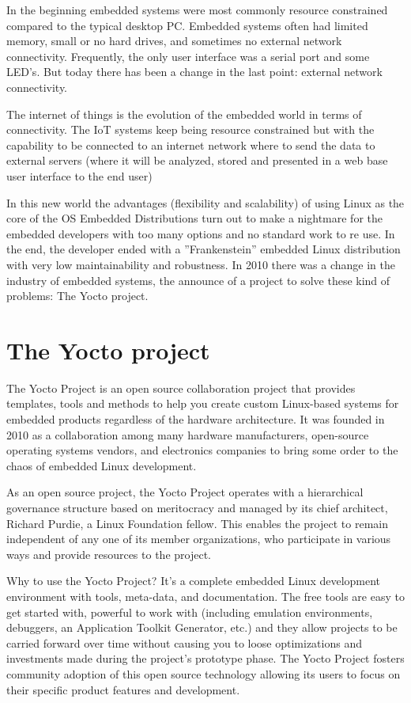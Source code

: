 In the beginning embedded systems were most commonly resource constrained
compared to the typical desktop PC. Embedded systems often had limited memory,
small or no hard drives, and sometimes no external network connectivity.
Frequently, the only user interface was a serial port and some LED's. But today
there has been a change in the last point: external network connectivity.

The internet of things is the evolution of the embedded world in terms of
connectivity. The IoT systems keep being resource constrained but with the
capability to be connected to an internet network where to send the data to
external servers (where it will be analyzed, stored and presented in a web base
user interface to the end user)

In this new world the advantages (flexibility and scalability) of using Linux
as the core of the OS Embedded Distributions turn out to make a nightmare for
the embedded developers with too many options and no standard work to re use.
In the end, the developer ended with a ''Frankenstein'' embedded Linux
distribution with very low maintainability and robustness. In 2010 there was a
change in the industry of embedded systems, the announce of a project to solve
these kind of problems: The Yocto project.

\section{The Yocto project}
\noindent
The Yocto Project is an open source collaboration project that provides
templates, tools and methods to help you create custom Linux-based systems for
embedded products regardless of the hardware architecture. It was founded in
2010 as a collaboration among many hardware manufacturers, open-source
operating systems vendors, and electronics companies to bring some order to the
chaos of embedded Linux development.\cite{yocto-project}

As an open source project, the Yocto Project operates with a hierarchical
governance structure based on meritocracy and managed by its chief architect,
Richard Purdie, a Linux Foundation fellow. This enables the project to remain
independent of any one of its member organizations, who participate in various
ways and provide resources to the project.

Why to use the Yocto Project? It's a complete embedded Linux development
environment with tools, meta-data, and documentation. The
free tools are easy to get started with, powerful to work with (including
emulation environments, debuggers, an Application Toolkit Generator, etc.) and
they allow projects to be carried forward over time without causing you to loose
optimizations and investments made during the project's prototype phase. The
Yocto Project fosters community adoption of this open source technology
allowing its users to focus on their specific product features and development.

